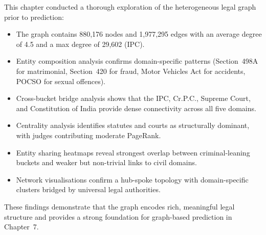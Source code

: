 This chapter conducted a thorough exploration of the heterogeneous legal graph prior to prediction:

\begin{itemize}
    \item The graph contains 880,176 nodes and 1,977,295 edges with an average degree of 4.5 and a max degree of 29,602 (IPC).
    \item Entity composition analysis confirms domain-specific patterns (Section~498A for matrimonial, Section~420 for fraud, Motor Vehicles Act for accidents, POCSO for sexual offences).
    \item Cross-bucket bridge analysis shows that the IPC, Cr.P.C., Supreme Court, and Constitution of India provide dense connectivity across all five domains.
    \item Centrality analysis identifies statutes and courts as structurally dominant, with judges contributing moderate PageRank.
    \item Entity sharing heatmaps reveal strongest overlap between criminal-leaning buckets and weaker but non-trivial links to civil domains.
    \item Network visualisations confirm a hub-spoke topology with domain-specific clusters bridged by universal legal authorities.
\end{itemize}

These findings demonstrate that the graph encodes rich, meaningful legal structure and provides a strong foundation for graph-based prediction in Chapter~7.
